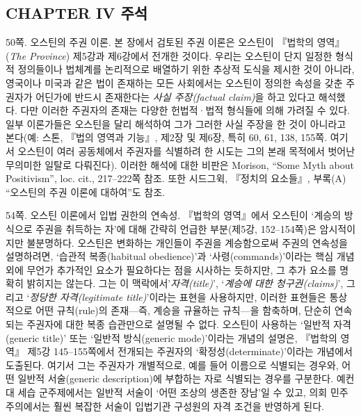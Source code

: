 {\footnotesize

\subsection{CHAPTER IV 주석}\label{chapter-iv-uxc8fcuxc11d}

50쪽. 오스틴의 주권 이론. 본 장에서 검토된 주권 이론은 오스틴이 『법학의
영역』(\emph{The Province}) 제5강과 제6강에서 전개한 것이다. 우리는
오스틴이 단지 일정한 형식적 정의들이나 법체계를 논리적으로 배열하기 위한
추상적 도식을 제시한 것이 아니라, 영국이나 미국과 같은 법이 존재하는
모든 사회에서는 오스틴이 정의한 속성을 갖춘 주권자가 어딘가에 반드시
존재한다는 \emph{사실 주장(factual claim)}을 하고 있다고 해석했다. 다만
이러한 주권자의 존재는 다양한 헌법적·법적 형식들에 의해 가려질 수 있다.
일부 이론가들은 오스틴을 달리 해석하여 그가 그러한 사실 주장을 한 것이
아니라고 본다(예: 스톤, 『법의 영역과 기능』, 제2장 및 제6장, 특히 60,
61, 138, 155쪽. 여기서 오스틴이 여러 공동체에서 주권자를 식별하려 한
시도는 그의 본래 목적에서 벗어난 무의미한 일탈로 다뤄진다). 이러한
해석에 대한 비판은 Morison, ``Some Myth about Positivism'', loc. cit.,
217--222쪽 참조. 또한 시드그윅, 『정치의 요소들』, 부록(A) ``오스틴의
주권 이론에 대하여''도 참조.

54쪽. 오스틴 이론에서 입법 권한의 연속성. 『법학의 영역』에서 오스틴이
`계승의 방식으로 주권을 취득하는 자'에 대해 간략히 언급한 부분(제5강,
152--154쪽)은 암시적이지만 불분명하다. 오스틴은 변화하는 개인들이 주권을
계승함으로써 주권의 연속성을 설명하려면, `습관적 복종(habitual
obedience)'과 `사령(commands)'이라는 핵심 개념 외에 무언가 추가적인
요소가 필요하다는 점을 시사하는 듯하지만, 그 추가 요소를 명확히 밝히지는
않는다. 그는 이 맥락에서'\emph{자격(title)}', `\emph{계승에 대한
청구권(claims)}', 그리고 `\emph{정당한 자격(legitimate title)}'이라는
표현을 사용하지만, 이러한 표현들은 통상적으로 어떤 규칙(rule)의
존재---즉, 계승을 규율하는 규칙---을 함축하며, 단순히 연속되는 주권자에
대한 복종 습관만으로 설명될 수 없다. 오스틴이 사용하는 `일반적
자격(generic title)' 또는 `일반적 방식(generic mode)'이라는 개념의
설명은, 『법학의 영역』 제5강 145--155쪽에서 전개되는 주권자의
`확정성(determinate)'이라는 개념에서 도출된다. 여기서 그는 주권자가
개별적으로, 예를 들어 이름으로 식별되는 경우와, 어떤 일반적 서술(generic
description)에 부합하는 자로 식별되는 경우를 구분한다. 예컨대 세습
군주제에서는 일반적 서술이 `어떤 조상의 생존한 장남'일 수 있고, 의회
민주주의에서는 훨씬 복잡한 서술이 입법기관 구성원의 자격 조건을 반영하게
된다.

}
